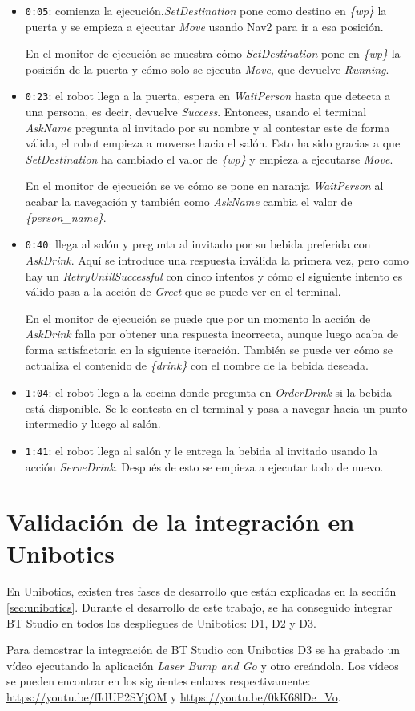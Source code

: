 \begin{itemize}
    \item \texttt{0:05}: comienza la ejecución.\textit{SetDestination} pone como destino en \textit{\{wp\}} la puerta y se empieza a ejecutar \textit{Move} usando Nav2 para ir a esa posición.

    En el monitor de ejecución se muestra cómo \textit{SetDestination} pone en \textit{\{wp\}} la posición de la puerta y cómo solo se ejecuta \textit{Move}, que devuelve \textit{Running}. 
    \item \texttt{0:23}: el robot llega a la puerta, espera en \textit{WaitPerson} hasta que detecta a una persona, es decir, devuelve \textit{Success}. Entonces, usando el terminal \textit{AskName} pregunta al invitado por su nombre y al contestar este de forma válida, el robot empieza a moverse hacia el salón. Esto ha sido gracias a que \textit{SetDestination} ha cambiado el valor de \textit{\{wp\}} y empieza a ejecutarse \textit{Move}.

    En el monitor de ejecución se ve cómo se pone en naranja \textit{WaitPerson} al acabar la navegación y también como \textit{AskName} cambia el valor de \textit{\{person\_name\}}.
    \item \texttt{0:40}: llega al salón y pregunta al invitado por su bebida preferida con \textit{AskDrink}. Aquí se introduce una respuesta inválida la primera vez, pero como hay un \textit{RetryUntilSuccessful} con cinco intentos y cómo el siguiente intento es válido pasa a la acción de \textit{Greet} que se puede ver en el terminal.

    En el monitor de ejecución se puede que por un momento la acción de \textit{AskDrink} falla por obtener una respuesta incorrecta, aunque luego acaba de forma satisfactoria en la siguiente iteración. También se puede ver cómo se actualiza el contenido de \textit{\{drink\}} con el nombre de la bebida deseada.
    \item \texttt{1:04}: el robot llega a la cocina donde pregunta en \textit{OrderDrink} si la bebida está disponible. Se le contesta en el terminal y pasa a navegar hacia un punto intermedio y luego al salón.
    \item \texttt{1:41}: el robot llega al salón y le entrega la bebida al invitado usando la acción \textit{ServeDrink}. Después de esto se empieza a ejecutar todo de nuevo.
\end{itemize}

\section{Validación de la integración en Unibotics}\label{sec:bt-unib-valid}

En Unibotics, existen tres fases de desarrollo que están explicadas en la sección \ref{sec:unibotics}. Durante el desarrollo de este trabajo, se ha conseguido integrar BT Studio en todos los despliegues de Unibotics: D1, D2 y D3.

Para demostrar la integración de BT Studio con Unibotics D3 se ha grabado un vídeo ejecutando la aplicación \textit{Laser Bump and Go} y otro creándola. Los vídeos se pueden encontrar en los siguientes enlaces respectivamente: \url{https://youtu.be/fIdUP2SYjOM} y \url{https://youtu.be/0kK68lDe_Vo}.
